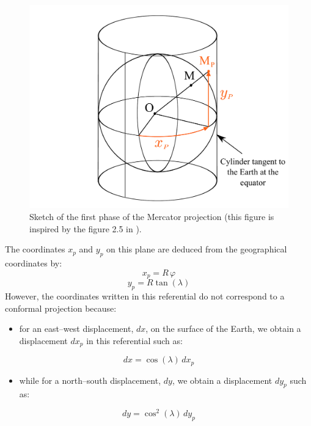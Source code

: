 \begin{figure}[tbh]%
  \centering
  \includegraphics[scale=0.4]
  {graphics/mercator.pdf}%
  \caption{Sketch of the first phase of the Mercator projection (this figure is
  inspired by the figure 2.5 in \cite{hervouet007}).}%
  \label{figure5}%
\end{figure}

The coordinates $x_{p}$ and $y_{p}$ on this plane are deduced from the
geographical coordinates by:%
\[x_{p}=R\,\varphi\]
\[y_{p}=R\tan(\lambda)\]
However, the coordinates written in this referential do not correspond to a
conformal projection because:

\begin{itemize}
\item for an east--west displacement, $dx$, on the surface of the Earth, we
  obtain a displacement $dx_{p}$ in this referential such as:
\end{itemize}
\begin{equation}
  dx=\cos(\lambda)\,dx_{p}%
\end{equation}
\begin{itemize}
\item while for a north--south displacement, $dy$, we obtain a displacement
  $dy_{p}$ such as:
\end{itemize}
\begin{equation}
  dy=\cos^{2}(\lambda)\,dy_{p}%
\end{equation}

